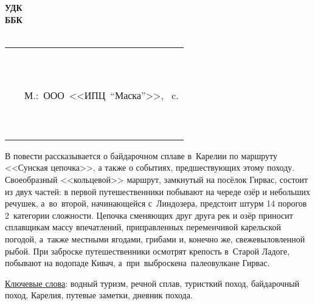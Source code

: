 {
\thispagestyle{empty}
%
\small{
\begin{flushleft}
\textbf{%
	УДК \UDK \\
	ББК \BBK \\
	\BibCode \\
}
\end{flushleft}
%
\vspace{1cm}
%
\begin{flushright}
{
\begin{tabular}[c]{>{\raggedright}m{14mm} >{\raggedright}m{95mm} }
	\textbf{\BibCode} & \MyVarAuthorName \tabularnewline
	~ & \MyVarBookName \tabularnewline
	~ & \MyVarBookNamesec \tabularnewline
	~ & М.:~ООО~<<ИПЦ~"`Маска"'>>,~\year\mdash \pageref{LastPage} c. \tabularnewline	
	~ & \textbf{\ISBN} \tabularnewline
	~ & \ciao{16+}
\end{tabular}
}
\end{flushright}
%
\vspace{0.5cm}
\hspace{1.0cm} В повести рассказывается о байдарочном сплаве в~Карелии по маршруту <<Сунская цепочка>>, а также о событиях, предшествующих этому походу. Своеобразный <<кольцевой>> маршрут, замкнутый на посёлок Гирвас, состоит из двух частей: в первой путешественники побывают на череде озёр и небольших речушек, а~во~второй, начинающейся с~Линдозера, предстоит штурм 14 порогов 2~категории сложности. Цепочка сменяющих друг друга рек и озёр приносит сплавщикам массу впечатлений, приправленных переменчивой карельской погодой, а~также местными ягодами, грибами и, конечно же, свежевыловленной рыбой. При заброске путешественники осмотрят крепость в~Старой Ладоге, побывают на водопаде Кивач, а~при~выброске\mdash на~палеовулкане Гирвас.

\vspace{4mm}
\noindent \underline{Ключевые слова}: водный туризм, речной сплав, туристкий поход, байдарочный поход, Карелия, путевые заметки, дневник похода.
%
%
\vspace{4mm}
%

\noindent\makebox[\textwidth][s]{\textbf{\ISBN}\hfill{\copyright~\MyVarAuthorName,~\year}}
}

}